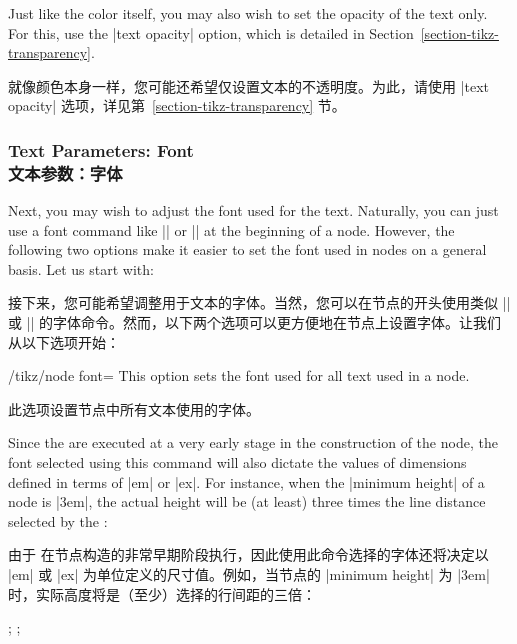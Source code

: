 Just like the color itself, you may also wish to set the opacity of the text
only. For this, use the |text opacity| option, which is detailed in
Section~\ref{section-tikz-transparency}.

就像颜色本身一样，您可能还希望仅设置文本的不透明度。为此，请使用 |text opacity| 选项，详见第~\ref{section-tikz-transparency} 节。

\subsubsection{Text Parameters: Font\\文本参数：字体}

Next, you may wish to adjust the font used for the text. Naturally, you can
just use a font command like |\small| or |\rm| at the beginning of a node.
However, the following two options make it easier to set the font used in nodes
on a general basis. Let us start with:

接下来，您可能希望调整用于文本的字体。当然，您可以在节点的开头使用类似 |\small| 或 |\rm| 的字体命令。然而，以下两个选项可以更方便地在节点上设置字体。让我们从以下选项开始：

\begin{key}{/tikz/node font=}
    This option sets the font used for all text used in a node.
    
    此选项设置节点中所有文本使用的字体。
\begin{codeexample}[]
\end{codeexample}
    Since the  are executed at a very early stage in the
    construction of the node, the font selected using this command will also
    dictate the values of dimensions defined in terms of |em| or |ex|. For
    instance, when the |minimum height| of a node is |3em|, the actual height
    will be (at least) three times the line distance selected by the :

    由于  在节点构造的非常早期阶段执行，因此使用此命令选择的字体还将决定以 |em| 或 |ex| 为单位定义的尺寸值。例如，当节点的 |minimum height| 为 |3em| 时，实际高度将是（至少）选择的行间距的三倍：
\begin{codeexample}[]
\tikz {};
\tikz {};
\end{codeexample}
\end{key}

